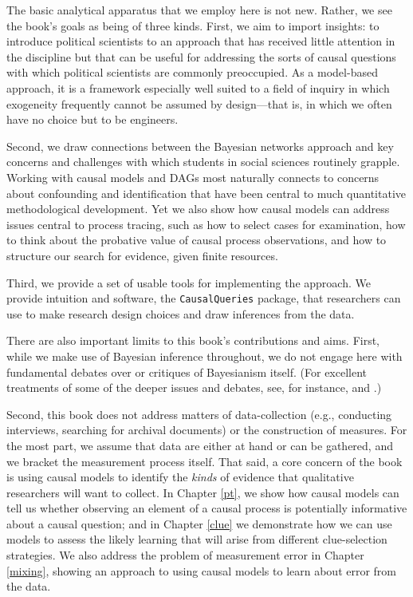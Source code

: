 \documentclass[
  12pt,
]{book}
\begin{document}
The basic analytical apparatus that we employ here is not new. Rather, we see the book's goals as being of three kinds. First, we aim to import insights: to introduce political scientists to an approach that has received little attention in the discipline but that can be useful for addressing the sorts of causal questions with which political scientists are commonly preoccupied. As a model-based approach, it is a framework especially well suited to a field of inquiry in which exogeneity frequently cannot be assumed by design---that is, in which we often have no choice but to be engineers.

Second, we draw connections between the Bayesian networks approach and key concerns and challenges with which students in social sciences routinely grapple. Working with causal models and DAGs most naturally connects to concerns about confounding and identification that have been central to much quantitative methodological development. Yet we also show how causal models can address issues central to process tracing, such as how to select cases for examination, how to think about the probative value of causal process observations, and how to structure our search for evidence, given finite resources.

Third, we provide a set of usable tools for implementing the approach. We provide intuition and software, the \texttt{CausalQueries} package, that researchers can use to make research design choices and draw inferences from the data.

There are also important limits to this book's contributions and aims. First, while we make use of Bayesian inference throughout, we do not engage here with fundamental debates over or critiques of Bayesianism itself. (For excellent treatments of some of the deeper issues and debates, see, for instance, \citet{earman1992bayes} and \citet{fairfield2017explicit}.)

Second, this book does not address matters of data-collection (e.g., conducting interviews, searching for archival documents) or the construction of measures. For the most part, we assume that data are either at hand or can be gathered, and we bracket the measurement process itself. That said, a core concern of the book is using causal models to identify the \emph{kinds} of evidence that qualitative researchers will want to collect. In Chapter \ref{pt}, we show how causal models can tell us whether observing an element of a causal process is potentially informative about a causal question; and in Chapter \ref{clue} we demonstrate how we can use models to assess the likely learning that will arise from different clue-selection strategies. We also address the problem of measurement error in Chapter \ref{mixing}, showing an approach to using causal models to learn about error from the data.
\end{document}
